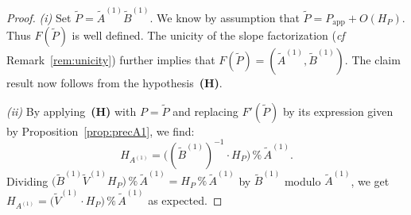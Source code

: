 \documentclass{sig-alternate-2013}
\renewcommand{\mod}{\,\%\,}
\newcommand{\app}{\textrm{app}}
\begin{document}
\begin{proof}
\emph{(i)} 
Set $\tilde P = \tilde A^{(1)} \tilde B^{(1)}$. We know by assumption
that $\tilde P = P_\app + O(H_P)$. Thus $F(\tilde P)$ is well defined.
The unicity of the slope factorization (\emph{cf} 
Remark~\ref{rem:unicity}) further implies that $F(\tilde P) = 
(\tilde A^{(1)}, \tilde B^{(1)})$. The claim result now follows from
the hypothesis~\textbf{(H)}.

\smallskip

\emph{(ii)} By applying~\textbf{(H)} with $P = \tilde P$ and replacing 
$F'(\tilde P)$ by its expression given by Proposition~\ref{prop:precA1}, 
we find:
$$H_{A^{(1)}} = \big((\tilde B^{(1)})^{-1} \cdot H_P\big) \mod \tilde A^{(1)}.$$
Dividing $\big(\tilde B^{(1)} \tilde V^{(1)} H_P\big) \mod \tilde 
A^{(1)} = H_P \mod \tilde A^{(1)}$ by $\tilde B^{(1)}$ modulo $\tilde
A^{(1)}$, we get
$H_{A^{(1)}} = \big(\tilde V^{(1)} \cdot H_P\big) \mod \tilde A^{(1)}$
as expected.
\end{proof}
\end{document}
